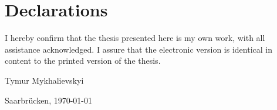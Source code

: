 ﻿\section*{Declarations}
I hereby confirm that the thesis presented here is my own work, with all assistance acknowledged. I assure that the electronic version is identical in content to the printed version of the thesis.

\vspace{2cm}


Tymur Mykhalievskyi

Saarbrücken, \today